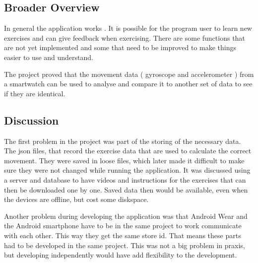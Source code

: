 \subsection{Broader Overview}
In general the application works . It is possible for the program user  to learn new exercises and can give feedback when exercising. There are some functions that are not yet implemented and some that need to be improved to make things easier to use and understand.

The project proved that the movement data ( gyroscope and accelerometer ) from a smartwatch can be used to analyse and compare it to another set of data to see if they are identical.


\subsection{Discussion}
The first problem in the project was part of the storing of the necessary data. The json files, that record the exercise data that are used to calculate the correct movement. They were saved in loose files, which later made it difficult to make sure they were not changed while running the application. It was discussed using a server and database to have videos and instructions for the exercises that can then be downloaded one by one. Saved data then would be available, even when the devices are offline, but cost some diskspace.

Another problem during developing the application was that Android Wear and the Android smartphone have to be in the same project to work communicate with each other. This way they get the same store id. That means these parts had to be developed in the same project. This was not a big problem in praxis, but developing independently would have add flexibility to the development.

